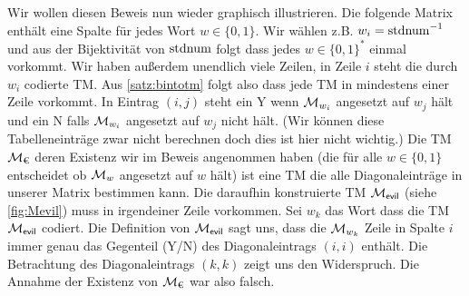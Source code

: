 Wir wollen diesen Beweis nun wieder graphisch illustrieren.
Die folgende Matrix enthält eine Spalte für jedes Wort $w\in\{0,1\}$.
Wir wählen z.B. $w_i=\operatorname{stdnum}^{-1}$ und aus der Bijektivität von $\operatorname{stdnum}$ folgt dass jedes $w\in\{0,1\}^*$ einmal vorkommt.
Wir haben außerdem unendlich viele Zeilen, in Zeile $i$ steht die durch $w_i$ codierte \ac{TM}.
Aus \autoref{satz:bintotm} folgt also dass jede \ac{TM} in mindestens einer Zeile vorkommt.
In Eintrag $(i,j)$ steht ein Y wenn $\mathcal{M}_{w_i}$ angesetzt auf $w_j$ hält und ein N falls $\mathcal{M}_{w_i}$ angesetzt auf $w_j$ nicht hält.
(Wir können diese Tabelleneinträge zwar nicht berechnen doch dies ist hier nicht wichtig.)
Die \ac{TM} $\mathcal{M}_\text{€}$ deren Existenz wir im Beweis angenommen haben (die für alle $w\in\{0,1\}$ entscheidet ob $\mathcal{M}_w$ angesetzt auf $w$ hält) ist eine \ac{TM} die alle Diagonaleinträge in unserer Matrix bestimmen kann.
Die daraufhin konstruierte \ac{TM} $\mathcal{M}_\textsf{evil}$ (siehe \autoref{fig:Mevil}) muss in irgendeiner Zeile vorkommen.
Sei $w_k$ das Wort dass die \ac{TM} $\mathcal{M}_\textsf{evil}$ codiert.
Die Definition von $\mathcal{M}_\textsf{evil}$ sagt uns, dass die $\mathcal{M}_{w_k}$ Zeile in Spalte $i$ immer genau das Gegenteil (Y/N) des Diagonaleintrags $(i,i)$ enthält. Die Betrachtung des Diagonaleintrags $(k,k)$ zeigt uns den Widerspruch.
Die Annahme der Existenz von $\mathcal{M}_\text{€}$ war also falsch. 


